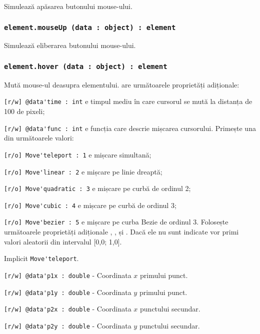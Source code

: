 Simulează apăsarea butonului mouse-ului.

\subsubsection{\lstinline|element.mouseUp (data : object) : element|}

Simulează eliberarea butonului mouse-ului.

\subsubsection{\lstinline|element.hover (data : object) : element|}

Mută mouse-ul deasupra elementului.  are următoarele proprietăți adiționale:
\begin{icItems}
	\item \lstinline|[r/w] @data'time : int| e timpul mediu în care cursorul se mută la distanța de 100 de pixeli;
	\item \lstinline|[r/w] @data'func : int| e funcția care descrie mișcarea cursorului. Primește una din următoarele valori:
	\begin{icItems}
		\item \lstinline|[r/o] Move'teleport : 1| e mișcare simultană;
		\item \lstinline|[r/o] Move'linear : 2| e mișcare pe linie dreaptă;
		\item \lstinline|[r/o] Move'quadratic : 3| e mișcare pe curbă de ordinul 2;
		\item \lstinline|[r/o] Move'cubic : 4| e mișcare pe curbă de ordinul 3;
		\item \lstinline|[r/o] Move'bezier : 5| e mișcare pe curba Bezie de ordinul 3. Folosește următoarele proprietăți adiționale , ,  și . Dacă ele nu sunt indicate vor primi valori aleatorii din intervalul [0,0; 1,0].
	\end{icItems}
	Implicit \lstinline|Move'teleport|.
	\item \lstinline|[r/w] @data'p1x : double| - Coordinata $x$ primului punct.
	\item \lstinline|[r/w] @data'p1y : double| - Coordinata $y$ primului punct.
	\item \lstinline|[r/w] @data'p2x : double| - Coordinata $x$ punctului secundar.
	\item \lstinline|[r/w] @data'p2y : double| - Coordinata $y$ punctului secundar.
\end{icItems}

